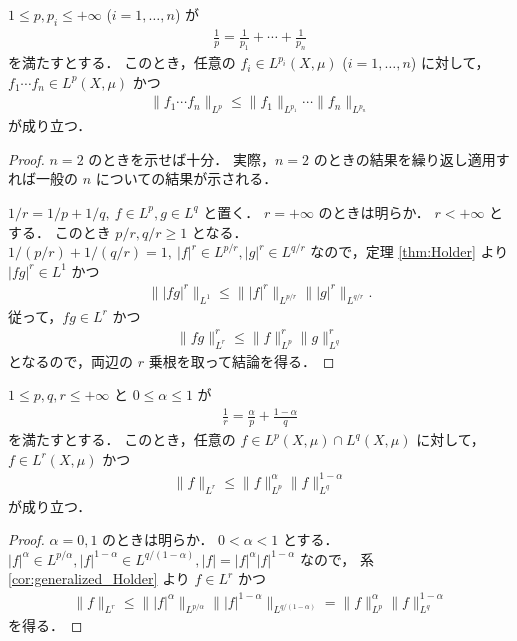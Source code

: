 \begin{corollary}\label{cor:generalized_Holder}
    $1\le p,p_i\le+\infty$ ($i=1,\ldots,n$) が
    \begin{align*}
        \frac{1}{p}=\frac{1}{p_1}+\cdots+\frac{1}{p_n}
    \end{align*}
    を満たすとする．
    このとき，任意の $f_i\in L^{p_i}(X,\mu)$ ($i=1,\ldots,n$) に対して，$f_1\cdots f_n\in L^p(X,\mu)$ かつ
    \begin{align*}
        \|f_1\cdots f_n\|_{L^p}\le\|f_1\|_{L^{p_1}}\cdots\|f_n\|_{L^{p_n}}
    \end{align*}
    が成り立つ．
\end{corollary}

\begin{proof}
    $n=2$ のときを示せば十分．
    実際，$n=2$ のときの結果を繰り返し適用すれば一般の $n$ についての結果が示される．

    $1/r=1/p+1/q,\ f\in L^p,g\in L^q$ と置く．
    $r=+\infty$ のときは明らか．
    $r<+\infty$ とする．
    このとき $p/r,q/r\ge1$ となる．
    $1/(p/r)+1/(q/r)=1,\ |f|^r\in L^{p/r},|g|^r\in L^{q/r}$ なので，定理 \ref{thm:Holder} より
    $|fg|^r\in L^1$ かつ
    \begin{align*}
        \||fg|^r\|_{L^1}
        \le\||f|^r\|_{L^{p/r}}\||g|^r\|_{L^{q/r}}.
    \end{align*}
    従って，$fg\in L^r$ かつ
    \begin{align*}
        \|fg\|_{L^r}^r
        \le\|f\|_{L^p}^r\|g\|_{L^q}^r
    \end{align*}
    となるので，両辺の $r$ 乗根を取って結論を得る．
\end{proof}

\begin{corollary}[補間不等式]\label{cor:Holder_interpolation}
    $1\le p,q,r\le+\infty$ と $0\le\alpha\le1$ が
    \begin{align*}
        \frac{1}{r}=\frac{\alpha}{p}+\frac{1-\alpha}{q}
    \end{align*}
    を満たすとする．
    このとき，任意の $f\in L^p(X,\mu)\cap L^q(X,\mu)$ に対して，$f\in L^r(X,\mu)$ かつ
    \begin{align*}
        \|f\|_{L^r}\le\|f\|_{L^p}^\alpha\|f\|_{L^q}^{1-\alpha}
    \end{align*}
    が成り立つ．
\end{corollary}

\begin{proof}
    $\alpha=0,1$ のときは明らか．
    $0<\alpha<1$ とする．
    $|f|^\alpha\in L^{p/\alpha},|f|^{1-\alpha}\in L^{q/(1-\alpha)},|f|=|f|^\alpha|f|^{1-\alpha}$ なので，
    系 \ref{cor:generalized_Holder} より $f\in L^r$ かつ
    \begin{align*}
        \|f\|_{L^r}
        \le\||f|^\alpha\|_{L^{p/\alpha}}\||f|^{1-\alpha}\|_{L^{q/(1-\alpha)}}
        =\|f\|_{L^p}^\alpha\|f\|_{L^q}^{1-\alpha}
    \end{align*}
    を得る．
\end{proof}

